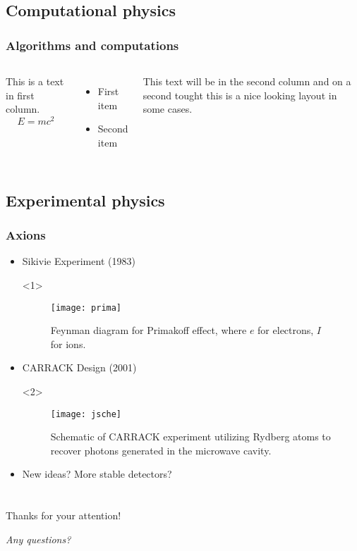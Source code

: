 \documentclass{beamer}
\begin{document}
\subsection{Computational physics}
\begin{frame}
  \frametitle{Algorithms and computations}
  \begin{columns}
    This is a text in first column.
    $$E=mc^2$$
    \begin{itemize}
    \item First item
    \item Second item
    \end{itemize}

    This text will be in the second column
    and on a second tought this is a nice looking
    layout in some cases.
  \end{columns}
  
\end{frame}

\subsection{Experimental physics}
\begin{frame}
  \frametitle{Axions}
  \begin{itemize}
  \item<1-> Sikivie Experiment (1983)
    \begin{onlyenv}<1>
      \begin{figure}
        \caption{Feynman diagram for Primakoff effect, where $e$ for
          electrons, $I$ for ions.} 
        \centering
        \texttt{[image: prima]}
      \end{figure}
    \end{onlyenv}
  \item<2-> CARRACK Design (2001)
    \begin{onlyenv}<2>
      \begin{figure}
        \centering
    \texttt{[image: jsche]}
    \caption{Schematic of CARRACK experiment utilizing Rydberg
      atoms to recover photons generated in the microwave
      cavity.} 
      \end{figure}
    \end{onlyenv}
  \item<3-> New ideas? More stable detectors?
  \end{itemize}
\end{frame}

\section{}
\begin{frame}
  \begin{center}
    \Huge{\alert{Thanks for your attention!}}\par
    \Huge{\textit{Any questions?}}
  \end{center}
  
\end{frame}
\end{document}
